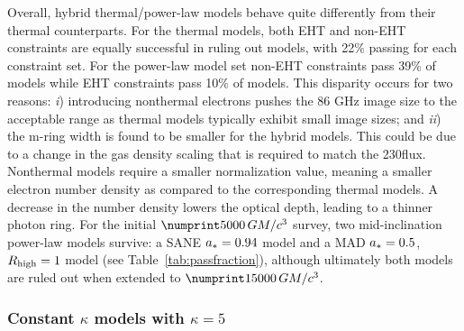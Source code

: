 Overall, \hamr hybrid thermal/power-law models behave quite differently from their thermal counterparts.
For the thermal models, both EHT and non-EHT constraints are equally successful in ruling out models, with 22\% passing for each constraint set. For the power-law model set non-EHT constraints pass 39\% of models while EHT constraints pass 10\% of models.
This disparity occurs for two reasons:
\emph{i}) introducing nonthermal electrons pushes the 86 GHz image size to the acceptable range as thermal models typically exhibit small image sizes; and
\emph{ii}) the m-ring width is found to be smaller for the hybrid models.
This could be due to a change in the gas density scaling that is required to match the 230\GHz flux.
Nonthermal models require a smaller normalization value, meaning a smaller electron number density as compared to the corresponding thermal models.
A decrease in the number density lowers the optical depth, leading to a thinner photon ring.
For the initial $\no{5000}\,\tg$ survey, two mid-inclination power-law models survive: a SANE $a_*=0.94$ model and a MAD $a_*=0.5$, $R_\mathrm{high}=1$ model (see Table~\ref{tab:passfraction}), although ultimately both models are ruled out when extended to $\no{15000}\,\tg$.

\subsubsection{Constant \texorpdfstring{$\kappa$}{kappa} models with \texorpdfstring{$\kappa = 5$}{kappa = 5}}
\label{sec:constant_kappa}

